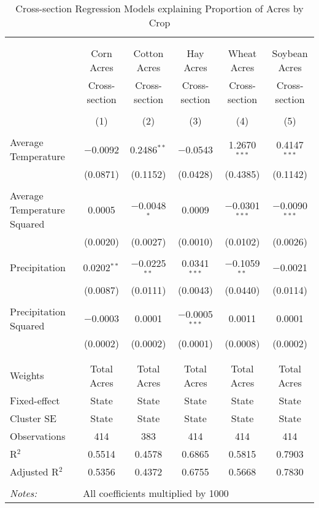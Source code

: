 \documentclass[10pt]{article}
\begin{document}
\newpage
\begin{table}[!htbp] \centering 
  \caption{Cross-section Regression Models explaining Proportion of Acres by Crop} 
  \label{} 
\footnotesize 
\begin{tabular}{@{\extracolsep{5pt}}lccccc} 
\\[-1.8ex]\hline 
\hline \\[-1.8ex] 
\\[-1.8ex] & Corn Acres & Cotton Acres & Hay Acres & Wheat Acres & Soybean Acres \\ 
 & Cross-section & Cross-section & Cross-section & Cross-section & Cross-section \\ 
\\[-1.8ex] & (1) & (2) & (3) & (4) & (5)\\ 
\hline \\[-1.8ex] 
 Average Temperature & $-$0.0092 & 0.2486$^{**}$ & $-$0.0543 & 1.2670$^{***}$ & 0.4147$^{***}$ \\ 
  & (0.0871) & (0.1152) & (0.0428) & (0.4385) & (0.1142) \\ 
  & & & & & \\ 
 Average Temperature Squared & 0.0005 & $-$0.0048$^{*}$ & 0.0009 & $-$0.0301$^{***}$ & $-$0.0090$^{***}$ \\ 
  & (0.0020) & (0.0027) & (0.0010) & (0.0102) & (0.0026) \\ 
  & & & & & \\ 
 Precipitation & 0.0202$^{**}$ & $-$0.0225$^{**}$ & 0.0341$^{***}$ & $-$0.1059$^{**}$ & $-$0.0021 \\ 
  & (0.0087) & (0.0111) & (0.0043) & (0.0440) & (0.0114) \\ 
  & & & & & \\ 
 Precipitation Squared & $-$0.0003 & 0.0001 & $-$0.0005$^{***}$ & 0.0011 & 0.0001 \\ 
  & (0.0002) & (0.0002) & (0.0001) & (0.0008) & (0.0002) \\ 
  & & & & & \\ 
\hline \\[-1.8ex] 
Weights & Total Acres & Total Acres & Total Acres & Total Acres & Total Acres \\ 
Fixed-effect & State & State & State & State & State \\ 
Cluster SE & State & State & State & State & State \\ 
Observations & 414 & 383 & 414 & 414 & 414 \\ 
R$^{2}$ & 0.5514 & 0.4578 & 0.6865 & 0.5815 & 0.7903 \\ 
Adjusted R$^{2}$ & 0.5356 & 0.4372 & 0.6755 & 0.5668 & 0.7830 \\ 
\hline 
\hline \\[-1.8ex] 
\textit{Notes:} & \multicolumn{5}{l}{All coefficients multiplied by 1000} \\ 
\end{tabular} 
\end{table} 
\end{document}
